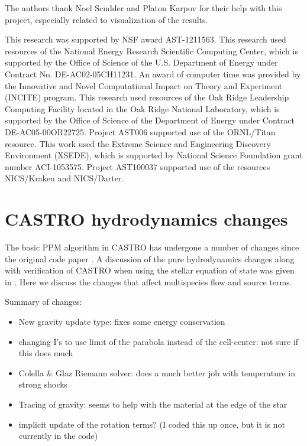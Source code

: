 \documentclass{emulateapj}
\begin{document}
\acknowledgments

The authors thank Noel Scudder and Platon Karpov for their help with 
this project, especially related to visualization of the results. 

This research was supported by NSF award AST-1211563.  This research
used resources of the National Energy Research Scientific Computing
Center, which is supported by the Office of Science of the
U.S. Department of Energy under Contract No. DE-AC02-05CH11231.  An
award of computer time was provided by the Innovative and Novel
Computational Impact on Theory and Experiment (INCITE) program.  This
research used resources of the Oak Ridge Leadership Computing Facility
located in the Oak Ridge National Laboratory, which is supported by
the Office of Science of the Department of Energy under Contract
DE-AC05-00OR22725. Project AST006 supported use of the ORNL/Titan resource. This work used the Extreme Science and Engineering Discovery Environment (XSEDE), which is supported by National Science Foundation grant number ACI-1053575. Project AST100037 supported use of the resources NICS/Kraken and NICS/Darter.


\clearpage





\clearpage
\appendix

\section{CASTRO hydrodynamics changes}

The basic PPM algorithm in CASTRO has undergone a number of changes
since the original code paper \citep{castro}.  A discussion of the
pure hydrodynamics changes along with verification of CASTRO when
using the stellar equation of state was given in
\citet{zingalekatz:2015}.  Here we discuss the changes that affect
multispecies flow and source terms.

Summary of changes:
\begin{itemize}
\item New gravity update type: fixes some energy conservation

\item changing I's to use limit of the parabola instead of the
  cell-center: not sure if this does much

\item Colella \& Glaz Riemann solver: does a much better job with
  temperature in strong shocks

\item Tracing of gravity: seems to help with the material at the edge
  of the star

\item implicit update of the rotation terms?  (I coded this up once, but
  it is not currently in the code)
\end{itemize}
\end{document}
